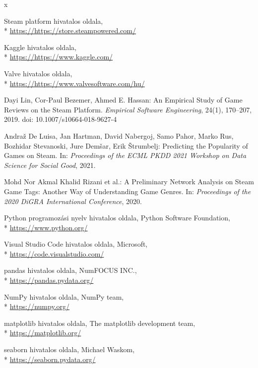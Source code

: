 \begin{thebibliography}{x}

 Steam platform hivatalos oldala,\\*
\url{https://https://store.steampowered.com/}

 Kaggle hivatalos oldala,\\*
\url{https://https://www.kaggle.com/}

 Valve hivatalos oldala,\\*
\url{https://https://www.valvesoftware.com/hu/}

Dayi Lin, Cor-Paul Bezemer, Ahmed E. Hassan:
An Empirical Study of Game Reviews on the Steam Platform.
\textit{Empirical Software Engineering}, 24(1), 170--207, 2019.
doi: 10.1007/s10664-018-9627-4

Andra{\v{z}} De Luisa, Jan Hartman, David Nabergoj, Samo Pahor, Marko Rus,
Bozhidar Stevanoski, Jure Dem{\v{s}}ar, Erik {\v{S}}trumbelj:
Predicting the Popularity of Games on Steam.
In: \textit{Proceedings of the ECML PKDD 2021 Workshop on Data Science for Social Good}, 2021.

Mohd Nor Akmal Khalid Rizani et al.:
A Preliminary Network Analysis on Steam Game Tags: Another Way of Understanding Game Genres.
In: \textit{Proceedings of the 2020 DiGRA International Conference}, 2020.

 Python programozási nyelv hivatalos oldala, Python Software Foundation,\\*
\url{https://www.python.org/}

 Visual Studio Code hivatalos oldala, Microsoft,\\*
\url{https://code.visualstudio.com/}

 pandas hivatalos oldala, NumFOCUS INC.,\\*
\url{https://pandas.pydata.org/}

 NumPy hivatalos oldala, NumPy team,\\*
\url{https://numpy.org/}

 matplotlib hivatalos oldala, The matplotlib development team,\\*
\url{https://matplotlib.org/}

 seaborn hivatalos oldala, Michael Waskom,\\*
\url{https://seaborn.pydata.org/}


\end{thebibliography}
